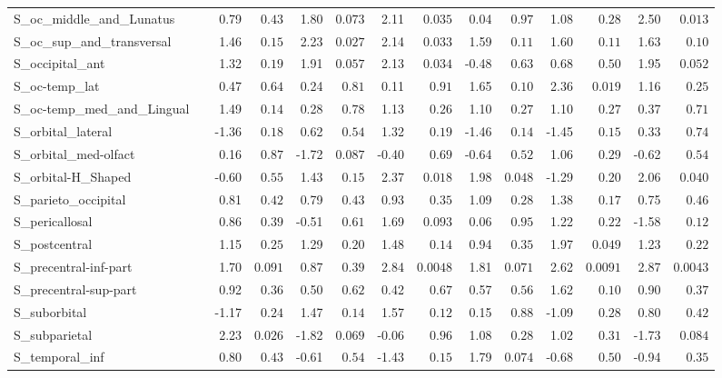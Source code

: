{\begin{longtable}{llrrrrrrrrrrrr}
S\_oc\_middle\_and\_Lunatus &  & 0.79 & $0.43$ & 1.80 & $0.073$ & 2.11 & $0.035$ & 0.04 & $0.97$ & 1.08 & $0.28$ & 2.50 & $0.013$ \\
S\_oc\_sup\_and\_transversal &  & 1.46 & $0.15$ & 2.23 & $0.027$ & 2.14 & $0.033$ & 1.59 & $0.11$ & 1.60 & $0.11$ & 1.63 & $0.10$ \\
S\_occipital\_ant &  & 1.32 & $0.19$ & 1.91 & $0.057$ & 2.13 & $0.034$ & -0.48 & $0.63$ & 0.68 & $0.50$ & 1.95 & $0.052$ \\
S\_oc-temp\_lat &  & 0.47 & $0.64$ & 0.24 & $0.81$ & 0.11 & $0.91$ & 1.65 & $0.10$ & 2.36 & $0.019$ & 1.16 & $0.25$ \\
S\_oc-temp\_med\_and\_Lingual &  & 1.49 & $0.14$ & 0.28 & $0.78$ & 1.13 & $0.26$ & 1.10 & $0.27$ & 1.10 & $0.27$ & 0.37 & $0.71$ \\
S\_orbital\_lateral &  & -1.36 & $0.18$ & 0.62 & $0.54$ & 1.32 & $0.19$ & -1.46 & $0.14$ & -1.45 & $0.15$ & 0.33 & $0.74$ \\
S\_orbital\_med-olfact &  & 0.16 & $0.87$ & -1.72 & $0.087$ & -0.40 & $0.69$ & -0.64 & $0.52$ & 1.06 & $0.29$ & -0.62 & $0.54$ \\
S\_orbital-H\_Shaped &  & -0.60 & $0.55$ & 1.43 & $0.15$ & 2.37 & $0.018$ & 1.98 & $0.048$ & -1.29 & $0.20$ & 2.06 & $0.040$ \\
S\_parieto\_occipital &  & 0.81 & $0.42$ & 0.79 & $0.43$ & 0.93 & $0.35$ & 1.09 & $0.28$ & 1.38 & $0.17$ & 0.75 & $0.46$ \\
S\_pericallosal &  & 0.86 & $0.39$ & -0.51 & $0.61$ & 1.69 & $0.093$ & 0.06 & $0.95$ & 1.22 & $0.22$ & -1.58 & $0.12$ \\
S\_postcentral &  & 1.15 & $0.25$ & 1.29 & $0.20$ & 1.48 & $0.14$ & 0.94 & $0.35$ & 1.97 & $0.049$ & 1.23 & $0.22$ \\
S\_precentral-inf-part &  & 1.70 & $0.091$ & 0.87 & $0.39$ & 2.84 & $0.0048$ & 1.81 & $0.071$ & 2.62 & $0.0091$ & 2.87 & $0.0043$ \\
S\_precentral-sup-part &  & 0.92 & $0.36$ & 0.50 & $0.62$ & 0.42 & $0.67$ & 0.57 & $0.56$ & 1.62 & $0.10$ & 0.90 & $0.37$ \\
S\_suborbital &  & -1.17 & $0.24$ & 1.47 & $0.14$ & 1.57 & $0.12$ & 0.15 & $0.88$ & -1.09 & $0.28$ & 0.80 & $0.42$ \\
S\_subparietal &  & 2.23 & $0.026$ & -1.82 & $0.069$ & -0.06 & $0.96$ & 1.08 & $0.28$ & 1.02 & $0.31$ & -1.73 & $0.084$ \\
S\_temporal\_inf &  & 0.80 & $0.43$ & -0.61 & $0.54$ & -1.43 & $0.15$ & 1.79 & $0.074$ & -0.68 & $0.50$ & -0.94 & $0.35$ \\

\end{longtable}}
